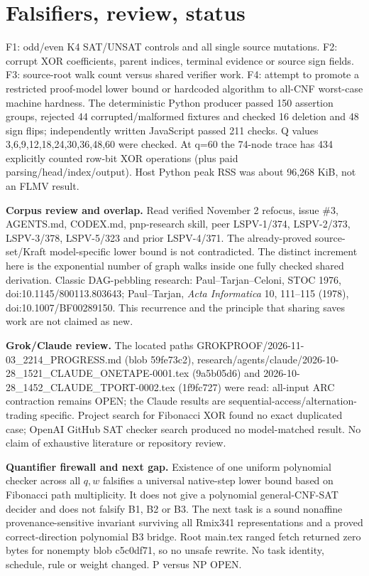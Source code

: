 \documentclass[11pt]{article}
\begin{document}
\section*{Falsifiers, review, status}
F1: odd/even K4 SAT/UNSAT controls and all single source mutations. F2: corrupt XOR coefficients, parent indices, terminal evidence or source sign fields. F3: source-root walk count versus shared verifier work. F4: attempt to promote a restricted proof-model lower bound or hardcoded algorithm to all-CNF worst-case machine hardness. The deterministic Python producer passed 150 assertion groups, rejected 44 corrupted/malformed fixtures and checked 16 deletion and 48 sign flips; independently written JavaScript passed 211 checks. Q values 3,6,9,12,18,24,30,36,48,60 were checked. At q=60 the 74-node trace has 434 explicitly counted row-bit XOR operations (plus paid parsing/head/index/output). Host Python peak RSS was about 96,268 KiB, not an FLMV result.

\noindent\textbf{Corpus review and overlap.} Read verified November 2 refocus, issue \#3, AGENTS.md, CODEX.md, pnp-research skill, peer LSPV-1/374, LSPV-2/373, LSPV-3/378, LSPV-5/323 and prior LSPV-4/371. The already-proved source-set/Kraft model-specific lower bound is not contradicted. The distinct increment here is the exponential number of graph walks inside one fully checked shared derivation. Classic DAG-pebbling research: Paul--Tarjan--Celoni, STOC 1976, doi:10.1145/800113.803643; Paul--Tarjan, \emph{Acta Informatica} 10, 111--115 (1978), doi:10.1007/BF00289150. This recurrence and the principle that sharing saves work are not claimed as new.

\noindent\textbf{Grok/Claude review.} The located paths GROKPROOF/2026-11-03\_2214\_PROGRESS.md (blob 59fe73c2), research/agents/claude/2026-10-28\_1521\_CLAUDE\_ONETAPE-0001.tex (9a5b05d6) and 2026-10-28\_1452\_CLAUDE\_TPORT-0002.tex (1f9fc727) were read: all-input ARC contraction remains OPEN; the Claude results are sequential-access/alternation-trading specific. Project search for Fibonacci XOR found no exact duplicated case; OpenAI GitHub SAT checker search produced no model-matched result. No claim of exhaustive literature or repository review.

\noindent\textbf{Quantifier firewall and next gap.} Existence of one uniform polynomial checker across all $q,w$ falsifies a universal native-step lower bound based on Fibonacci path multiplicity. It does not give a polynomial general-CNF-SAT decider and does not falsify B1, B2 or B3. The next task is a sound nonaffine provenance-sensitive invariant surviving all Rmix341 representations and a proved correct-direction polynomial B3 bridge. Root main.tex ranged fetch returned zero bytes for nonempty blob c5c0df71, so no unsafe rewrite. No task identity, schedule, rule or weight changed. P versus NP OPEN.

\end{document}
